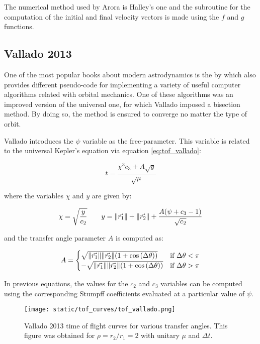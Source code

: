 The numerical method used by Arora is Halley's one and the subroutine for the
computation of the initial and final velocity vectors is made using the $f$ and
$g$ functions.


\subsection{Vallado 2013}

One of the most popular books about modern astrodynamics is the
 by which also provides different pseudo-code for
implementing a variety of useful computer algorithms related with orbital
mechanics. One of these algorithms was an improved version of the
\cite{bate1971} universal one, for which Vallado imposed a bisection method. By
doing so, the method is ensured to converge no matter the type of orbit.

Vallado introduces the $\psi$ variable as the free-parameter. This variable is
related to the universal Kepler's equation via equation \ref{eq:tof_vallado}:

\begin{equation}
  t = \frac{\chi^3 c_3 + A \sqrt{y}}{\sqrt{\mu}}
  \label{eq:tof_vallado}
\end{equation}

where the variables $\chi$ and $y$ are given by:

\begin{equation}
  \chi = \sqrt{\frac{y}{c_2}}\quad\quad
  y = \lVert\vec{r_1}\rVert + \lVert\vec{r_2}\rVert + \frac{A(\psi + c_3 - 1)}{\sqrt{c_2}}
\end{equation}

and the transfer angle parameter $A$ is computed as:

\begin{equation}
  A =
  \begin{cases}
    \sqrt{\lVert\vec{r_1}\rVert \lVert\vec{r_2}\rVert (1 + \cos{(\Delta \theta)})}  & \text{if $\Delta \theta < \pi$} \\
    -\sqrt{\lVert\vec{r_1}\rVert \lVert\vec{r_2}\rVert (1 + \cos{(\Delta \theta)})} & \text{if $\Delta \theta > \pi$} \\
  \end{cases}
\end{equation}

In previous equations, the values for the $c_2$ and $c_3$ variables can be
computed using the corresponding Stumpff coefficients evaluated at a particular
value of $\psi$.

\vspace{0.5cm}
\begin{figure}[h]
  \centering
  \texttt{[image: static/tof\_curves/tof\_vallado.png]}
  \caption[Vallado time of flight curves]{Vallado 2013 time of flight curves for various transfer angles. This
    figure was obtained for $\rho=r_2/r_1=2$ with unitary $\mu$ and $\Delta t$.}
  \label{fig:tof_vallado}
\end{figure}

